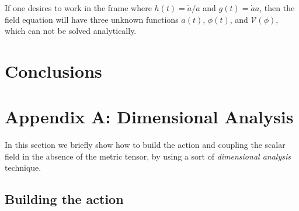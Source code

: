 \documentclass[10pt,a4paper]{article}
\begin{document}
If one desires to work in the frame where $h(t) = \dot{a}/a$ and $g(t) = \dot{a}a$, then the field equation will have three unknown
functions $a(t)$, $\phi(t)$, and $\mathcal{V}(\phi)$, which can not be solved analytically.

\section{Conclusions}


\section{Appendix A: Dimensional Analysis}

In this section we briefly show how to build the action and coupling the scalar field in the absence of the metric tensor, by using a sort of
\textit{dimensional analysis} technique.

\subsection{Building the action}
\end{document}
